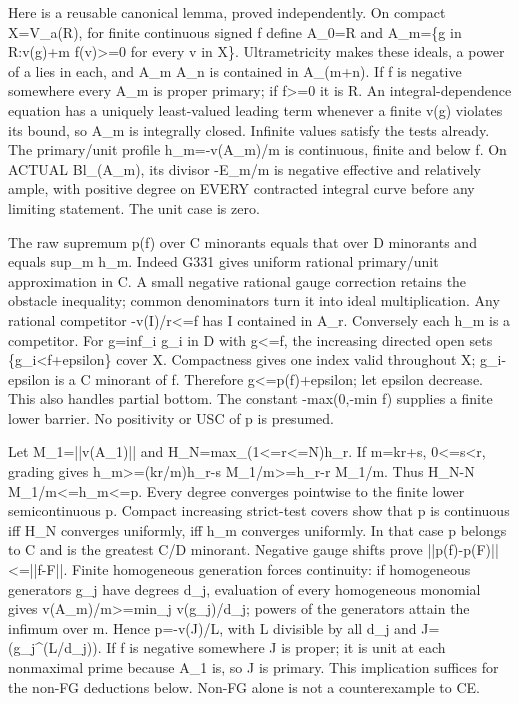 \documentclass[11pt]{article}
\begin{document}
Here is a reusable canonical lemma, proved independently. On compact X=V\_a(R), for finite continuous signed f define A\_0=R and A\_m=\{g in R:v(g)+m f(v)\textgreater{}=0 for every v in X\}. Ultrametricity makes these ideals, a power of a lies in each, and A\_m A\_n is contained in A\_(m+n). If f is negative somewhere every A\_m is proper primary; if f\textgreater{}=0 it is R. An integral-dependence equation has a uniquely least-valued leading term whenever a finite v(g) violates its bound, so A\_m is integrally closed. Infinite values satisfy the tests already. The primary/unit profile h\_m=-v(A\_m)/m is continuous, finite and below f. On ACTUAL Bl\_(A\_m), its divisor -E\_m/m is negative effective and relatively ample, with positive degree on EVERY contracted integral curve before any limiting statement. The unit case is zero.

The raw supremum p(f) over C minorants equals that over D minorants and equals sup\_m h\_m. Indeed G331 gives uniform rational primary/unit approximation in C. A small negative rational gauge correction retains the obstacle inequality; common denominators turn it into ideal multiplication. Any rational competitor -v(I)/r\textless{}=f has I contained in A\_r. Conversely each h\_m is a competitor. For g=inf\_i g\_i in D with g\textless{}=f, the increasing directed open sets \{g\_i\textless{}f+epsilon\} cover X. Compactness gives one index valid throughout X; g\_i-epsilon is a C minorant of f. Therefore g\textless{}=p(f)+epsilon; let epsilon decrease. This also handles partial bottom. The constant -max(0,-min f) supplies a finite lower barrier. No positivity or USC of p is presumed.

Let M\_1=||v(A\_1)|| and H\_N=max\_(1\textless{}=r\textless{}=N)h\_r. If m=kr+s, 0\textless{}=s\textless{}r, grading gives h\_m\textgreater{}=(kr/m)h\_r-s M\_1/m\textgreater{}=h\_r-r M\_1/m. Thus H\_N-N M\_1/m\textless{}=h\_m\textless{}=p. Every degree converges pointwise to the finite lower semicontinuous p. Compact increasing strict-test covers show that p is continuous iff H\_N converges uniformly, iff h\_m converges uniformly. In that case p belongs to C and is the greatest C/D minorant. Negative gauge shifts prove ||p(f)-p(F)||\textless{}=||f-F||. Finite homogeneous generation forces continuity: if homogeneous generators g\_j have degrees d\_j, evaluation of every homogeneous monomial gives v(A\_m)/m\textgreater{}=min\_j v(g\_j)/d\_j; powers of the generators attain the infimum over m. Hence p=-v(J)/L, with L divisible by all d\_j and J=(g\_j\textasciicircum{}(L/d\_j)). If f is negative somewhere J is proper; it is unit at each nonmaximal prime because A\_1 is, so J is primary. This implication suffices for the non-FG deductions below. Non-FG alone is not a counterexample to CE.
\end{document}
